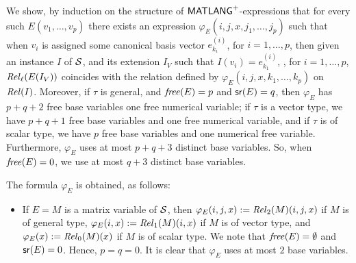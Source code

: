 We show, by induction on the structure of $\mathsf{MATLANG}^{\sf +}$-expressions that for every such $E(v_1,\ldots,\allowbreak v_p)$ there exists an
expression $\varphi_E(i,j,x,j_1,\ldots,j_p)$ such that when $v_i$ is assigned some canonical basis vector $e_{k_i}^{(i)}$,
for $i=1,\ldots,p$, then given an instance $I$ of $\mathcal{S}$, and its extension $I_V$ such that $I(v_i)=e_{k_1}^{(i)}$, ,
for $i=1,\ldots,p$, $\mathit{Rel}_\ell(E(I_V))$ coincides with
the relation defined by $\varphi_E(i,j,x,k_1,\ldots,k_p)$ on $\mathit{Rel}(I)$. Moreover, if $\tau$ is general, and $\operatorname{\mathit{free}}(E)=p$ and $\mathsf{sr}(E)=q$, then $\varphi_E$ has $p+q+2$ free base
variables  one free numerical variable; if 
$\tau$ is a vector type, we have $p+q+1$ free base variables and one free numerical variable, and if $\tau$ is of scalar type, we have
$p$ free base variables and one numerical free variable. Furthermore, $\varphi_E$ uses at most $p+q+3$ distinct base variables.
So, when $\operatorname{\mathit{free}}(E)=0$, we use at most $q+3$ distinct base variables.

The formula $\varphi_E$ is obtained, as follows:
\begin{itemize}
\item If $E = M$ is a matrix variable of $\mathcal{S}$, then $\varphi_E(i,j,x):=\mathit{Rel}_2(M)(i,j,x)$ if $M$ is of general type,
 $\varphi_E(i,x):=\mathit{Rel}_1(M)(i,x)$ if $M$ is of vector type, and $\varphi_E(x):=\mathit{Rel}_0(M)(x)$ if $M$ is of scalar type.
  We note that $\operatorname{\mathit{free}}(E)=\emptyset$ and $\mathsf{sr}(E)=0$.  Hence, $p=q=0$. It is clear that $\varphi_E$ uses at most $2$ base variables.
 \end{itemize}
 
